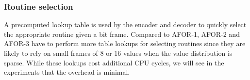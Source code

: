 \subsubsection{Routine selection}

A precomputed lookup table is used by the encoder and decoder to quickly
select the appropriate routine given a bit frame. Compared to AFOR-1, AFOR-2
and AFOR-3 have to perform more table lookups for selecting routines since
they are likely to rely on small frames of 8 or 16 values when the value
distribution is sparse. While these lookups cost additional CPU cycles, we
will see in the experiments that the overhead is minimal.
